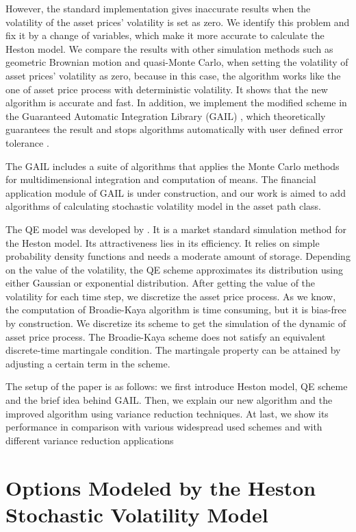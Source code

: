 \documentclass{ws-ijfe}
\begin{document}
However, the standard implementation gives inaccurate results when the volatility of the asset prices' volatility is set as zero. We identify this problem and fix it by a change of variables, which make it more accurate to calculate the Heston model. We compare the results with other simulation methods such as geometric Brownian motion and quasi-Monte Carlo, when setting the volatility of asset prices' volatility as zero, because in this case, the algorithm works like the one of asset price process with deterministic volatility. It shows that the new algorithm is accurate and fast. In addition, we implement the modified scheme in the Guaranteed Automatic Integration Library (GAIL) , which theoretically guarantees the result and stops algorithms automatically with user defined error tolerance .

The GAIL includes a suite of algorithms that applies the Monte Carlo methods for multidimensional integration and computation of means. The financial application module of GAIL is under construction, and our work is aimed to add algorithms of calculating stochastic volatility model in the asset path class.


The QE model was developed by \cite{Andersen2006}. It is a market standard simulation method for the Heston model. Its attractiveness lies in its efficiency. It relies on simple probability density functions and needs a moderate amount of storage. Depending on the value of the volatility, the QE scheme approximates its distribution using either Gaussian or exponential distribution. After getting the value of the volatility for each time step, we discretize the asset price process. As we know, the computation of Broadie-Kaya algorithm is time consuming, but it is bias-free by construction. We discretize its scheme to get the simulation of the dynamic of asset price process. The Broadie-Kaya scheme does not satisfy an equivalent discrete-time martingale condition. The martingale property can be attained by adjusting a certain term in the scheme.

The setup of the paper is as follows: we first introduce Heston model, QE scheme and the brief idea behind GAIL. Then, we explain our new algorithm and the improved algorithm using variance reduction techniques. At last, we show its performance in comparison with various widespread used schemes and with different variance reduction applications

\section{Options Modeled by the Heston Stochastic Volatility Model}
\end{document}
